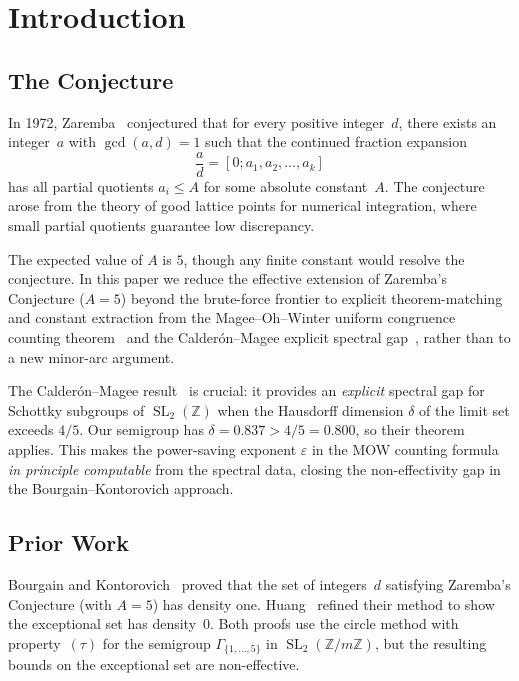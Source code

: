 \documentclass[11pt,a4paper]{amsart}
\theoremstyle{definition}
\DeclareMathOperator{\SL}{SL}
\begin{document}
\section{Introduction}

\subsection{The Conjecture}

In 1972, Zaremba~\cite{Zaremba1972} conjectured that for every positive integer~$d$, there exists an integer~$a$ with $\gcd(a,d)=1$ such that the continued fraction expansion
\[
\frac{a}{d} = [0; a_1, a_2, \ldots, a_k]
\]
has all partial quotients $a_i \leq A$ for some absolute constant~$A$. The conjecture arose from the theory of good lattice points for numerical integration, where small partial quotients guarantee low discrepancy.

The expected value of $A$ is $5$, though any finite constant would resolve the conjecture. In this paper we reduce the effective extension of Zaremba's Conjecture ($A=5$) beyond the brute-force frontier to explicit theorem-matching and constant extraction from the Magee--Oh--Winter uniform congruence counting theorem~\cite{MOW2019} and the Calder\'on--Magee explicit spectral gap~\cite{CM2025}, rather than to a new minor-arc argument.

The Calder\'on--Magee result~\cite{CM2025} is crucial: it provides an \emph{explicit} spectral gap for Schottky subgroups of $\SL_2(\mathbb{Z})$ when the Hausdorff dimension $\delta$ of the limit set exceeds $4/5$. Our semigroup has $\delta = 0.837 > 4/5 = 0.800$, so their theorem applies. This makes the power-saving exponent $\varepsilon$ in the MOW counting formula \emph{in principle computable} from the spectral data, closing the non-effectivity gap in the Bourgain--Kontorovich approach.

\subsection{Prior Work}

Bourgain and Kontorovich~\cite{BK2014} proved that the set of integers~$d$ satisfying Zaremba's Conjecture (with $A=5$) has density one. Huang~\cite{Huang2015} refined their method to show the exceptional set has density~$0$. Both proofs use the circle method with property~$(\tau)$ for the semigroup $\Gamma_{\{1,\ldots,5\}}$ in $\SL_2(\mathbb{Z}/m\mathbb{Z})$, but the resulting bounds on the exceptional set are non-effective.
\end{document}
